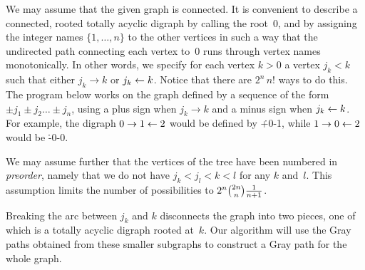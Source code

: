 We may assume that the given graph is connected.
It is convenient to describe a connected, rooted totally acyclic digraph by
calling the root~0, and by assigning the integer names $\{1,\ldots,n\}$
to the other vertices in such a way that the undirected path connecting
each vertex to~0 runs through vertex names monotonically. In other
words, we specify for each vertex $k>0$ a vertex $j_k<k$ such that
either $j_k\to k$ or $j_k\gets k$. Notice that there are
$2^n\,n!$ ways to do this. The program below works on the graph defined
by a sequence of the form ${\pm}j_1{\pm}j_2\ldots{\pm}j_n$, using
a plus sign when $j_k\to k$ and a minus sign when $j_k\gets k$.
For example, the digraph $0\to1\gets2$ would be defined by \.{+0-1},
while $1\to0\gets2$ would be \.{-0-0}.

We may assume further that the vertices of the tree have been numbered
in {\it preorder}, namely that we do not have $j_k<j_l<k<l$ for any
$k$ and~$l$. This assumption limits the number of possibilities to
$2^n{2n\choose n}{1\over n+1}$.

Breaking the arc between $j_k$ and $k$ disconnects the graph into two
pieces, one of which is a totally acyclic digraph rooted at~$k$. Our
algorithm will use the Gray paths obtained from these smaller subgraphs
to construct a Gray path for the whole graph.

